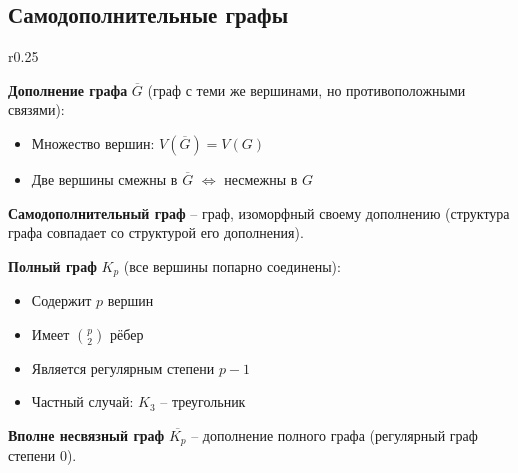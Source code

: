 \subsection{Самодополнительные графы}

\begin{wrapfigure}{r}{0.25\textwidth}
\end{wrapfigure}

\noindent\textbf{Дополнение графа} $\overline{G}$ (граф с теми же вершинами, но противоположными связями):
\begin{itemize}[noitemsep,topsep=0pt]
\item Множество вершин: $V(\overline{G}) = V(G)$
\item Две вершины смежны в $\overline{G}$ $\Leftrightarrow$ несмежны в $G$
\end{itemize}

\noindent\textbf{Самодополнительный граф} -- граф, изоморфный своему дополнению (структура графа совпадает со структурой его дополнения).

\noindent\textbf{Полный граф} $K_p$ (все вершины попарно соединены):
\begin{itemize}[noitemsep,topsep=0pt]
\item Содержит $p$ вершин
\item Имеет $\binom{p}{2}$ рёбер
\item Является регулярным степени $p-1$
\item Частный случай: $K_3$ -- треугольник
\end{itemize}

\noindent\textbf{Вполне несвязный граф} $\overline{K_p}$ -- дополнение полного графа (регулярный граф степени 0).
